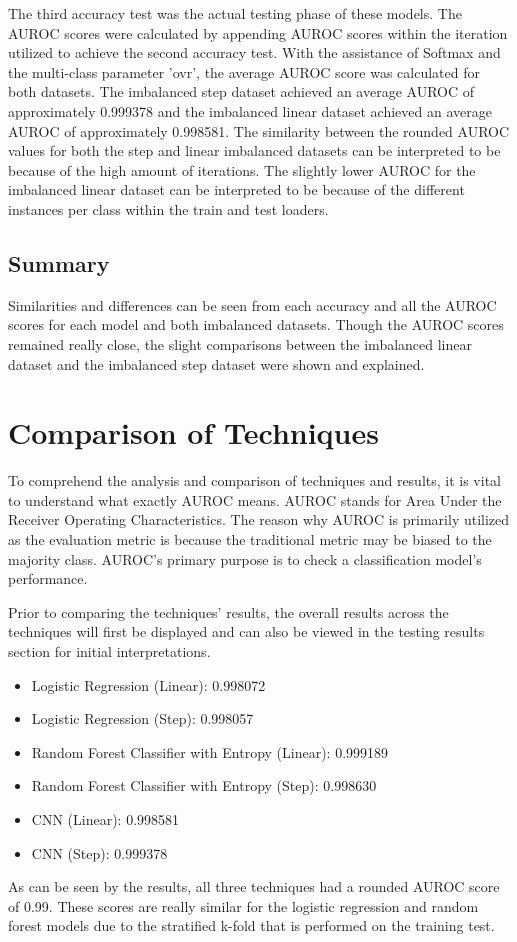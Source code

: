 \documentclass[conference]{IEEEtran}
\begin{document}
The third accuracy test was the actual testing phase of these models. The AUROC scores were calculated by appending AUROC scores within the iteration utilized to achieve the second accuracy test. With the assistance of Softmax and the multi-class parameter 'ovr', the average AUROC score was calculated for both datasets. The imbalanced step dataset achieved an average AUROC of approximately 0.999378 and the imbalanced linear dataset achieved an average AUROC of approximately 0.998581. The similarity between the rounded AUROC values for both the step and linear imbalanced datasets can be interpreted to be because of the high amount of iterations. The slightly lower AUROC for the imbalanced linear dataset can be interpreted to be because of the different instances per class within the train and test loaders. 

\subsection{Summary}
Similarities and differences can be seen from each accuracy and all the AUROC scores for each model and both imbalanced datasets. Though the AUROC scores remained really close, the slight comparisons between the imbalanced linear dataset and the imbalanced step dataset were shown and explained. 

\section{Comparison of Techniques}

To comprehend the analysis and comparison of techniques and results, it is vital to understand what exactly AUROC means. AUROC stands for Area Under the Receiver Operating Characteristics. The reason why AUROC is primarily utilized as the evaluation metric is because the traditional metric may be biased to the majority class. AUROC's primary purpose is to check a classification model's performance. 

Prior to comparing the techniques' results, the overall results across the techniques will first be displayed and can also be viewed in the testing results section for initial interpretations. 
\begin{itemize}
    \item Logistic Regression (Linear): 0.998072
    \item Logistic Regression (Step): 0.998057
    \item Random Forest Classifier with Entropy (Linear): 0.999189
    \item Random Forest Classifier with Entropy (Step): 0.998630
    \item CNN (Linear): 0.998581
    \item CNN (Step): 0.999378
\end{itemize}
As can be seen by the results, all three techniques had a rounded AUROC score of 0.99. These scores are really similar for the logistic regression and random forest models due to the stratified k-fold that is performed on the training test. 
\end{document}
